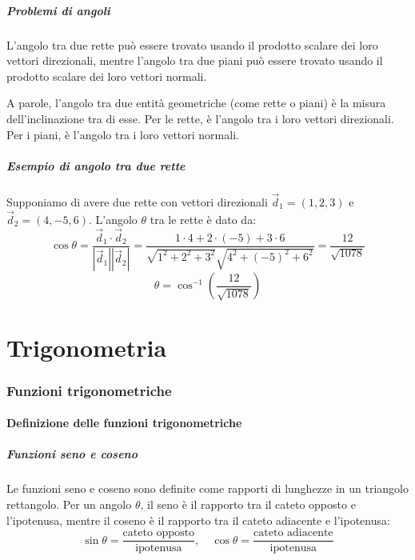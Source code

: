 \documentclass{article}
\begin{document}
\subsubsection{Problemi di angoli}
L'angolo tra due rette può essere trovato usando il prodotto scalare dei loro vettori
direzionali, mentre l'angolo tra due piani può essere trovato usando il prodotto scalare dei
loro vettori normali.

A parole, l'angolo tra due entità geometriche (come rette o piani) è la misura
dell'inclinazione tra di esse. Per le rette, è l'angolo tra i loro vettori direzionali.
Per i piani, è l'angolo tra i loro vettori normali.

\subsubsection{Esempio di angolo tra due rette}
Supponiamo di avere due rette con vettori direzionali \(\vec{d}_1 = (1, 2, 3)\) e \(\vec{d}_2 = (4, -5, 6)\). L'angolo \(\theta\) tra le rette è dato da:
\[
    \cos \theta = \frac{\vec{d}_1 \cdot \vec{d}_2}{|\vec{d}_1||\vec{d}_2|} =
    \frac{1 \cdot 4 + 2 \cdot (-5) + 3 \cdot 6}{\sqrt{1^2 + 2^2 + 3^2}
    \sqrt{4^2 + (-5)^2 + 6^2}} = \frac{12}{\sqrt{1078}}
\]
\[
    \theta = \cos^{-1} \left( \frac{12}{\sqrt{1078}} \right)
\]

\newpage
\part{Trigonometria}

\section{Funzioni trigonometriche}

\subsection{Definizione delle funzioni trigonometriche}

\subsubsection{Funzioni seno e coseno}
Le funzioni seno e coseno sono definite come rapporti di lunghezze in un triangolo rettangolo.
Per un angolo \(\theta\), il seno è il rapporto tra il cateto opposto e l'ipotenusa, mentre il
coseno è il rapporto tra il cateto adiacente e l'ipotenusa:
\[
    \sin \theta = \frac{\text{cateto opposto}}{\text{ipotenusa}},
    \quad \cos \theta = \frac{\text{cateto adiacente}}{\text{ipotenusa}}
\]
\end{document}
